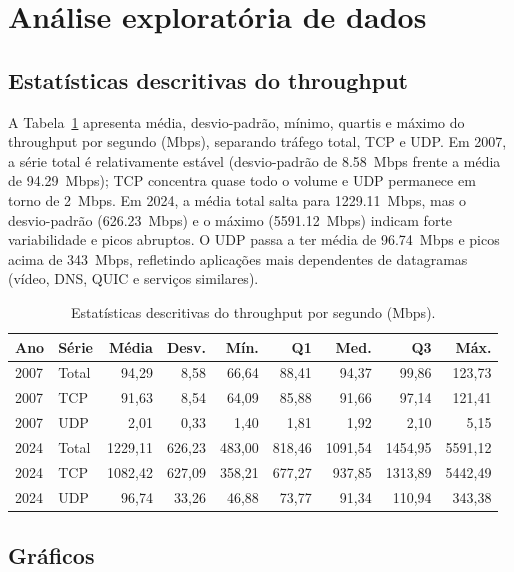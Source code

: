 \documentclass[12pt,a4paper]{article}
\begin{document}
\section{Análise exploratória de dados}

\subsection{Estatísticas descritivas do throughput}

A Tabela~\ref{tab:estatisticas} apresenta média, desvio-padrão, mínimo, quartis e máximo
do throughput por segundo (Mbps), separando tráfego total, TCP e UDP. Em 2007, a série
total é relativamente estável (desvio-padrão de \SI{8,58}{Mbps} frente a média de
\SI{94,29}{Mbps}); TCP concentra quase todo o volume e UDP permanece em torno de
\SI{2}{Mbps}. Em 2024, a média total salta para \SI{1229,11}{Mbps}, mas o
desvio-padrão (\SI{626,23}{Mbps}) e o máximo (\SI{5591,12}{Mbps}) indicam forte
variabilidade e picos abruptos. O UDP passa a ter média de \SI{96,74}{Mbps} e picos
acima de \SI{343}{Mbps}, refletindo aplicações mais dependentes de datagramas (vídeo,
DNS, QUIC e serviços similares).

\begin{table}[htbp]
  \centering
  \caption{Estatísticas descritivas do throughput por segundo (Mbps).}
  \label{tab:estatisticas}
  \small
  \begin{tabular}{llrrrrrrr}
    \toprule
    Ano & Série & Média & Desv. & Mín. & Q1 & Med. & Q3 & Máx. \\
    \midrule
    2007 & Total & 94,29 & 8,58 & 66,64 & 88,41 & 94,37 & 99,86 & 123,73 \\
    2007 & TCP   & 91,63 & 8,54 & 64,09 & 85,88 & 91,66 & 97,14 & 121,41 \\
    2007 & UDP   &  2,01 & 0,33 &  1,40 &  1,81 &  1,92 &  2,10 &   5,15 \\
    2024 & Total & 1229,11 & 626,23 & 483,00 & 818,46 & 1091,54 & 1454,95 & 5591,12 \\
    2024 & TCP   & 1082,42 & 627,09 & 358,21 & 677,27 & 937,85 & 1313,89 & 5442,49 \\
    2024 & UDP   &   96,74 &  33,26 &  46,88 &  73,77 &  91,34 &  110,94 &  343,38 \\
    \bottomrule
  \end{tabular}
\end{table}

\subsection{Gráficos}
\end{document}
